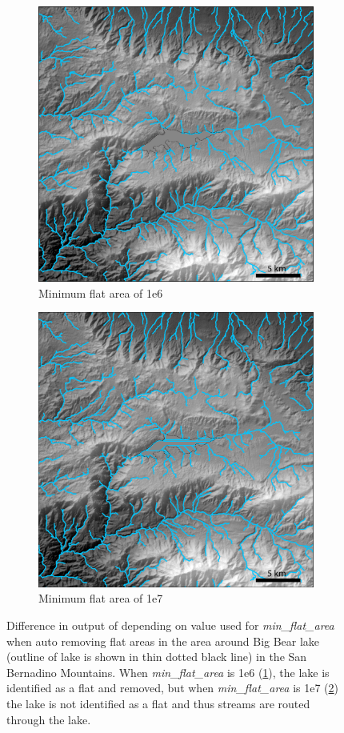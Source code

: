 \begin{figure}[H]
	\centering
	\begin{subfigure}{.40\textwidth}
		\centering
		\includegraphics[width=.8\linewidth]{PNGs/BigBear1e6.png}
		\caption{Minimum flat area of 1e6}
		\label{fig:mfsub1}
	\end{subfigure}%
	\begin{subfigure}{.40\textwidth}
		\centering
		\includegraphics[width=.8\linewidth]{PNGs/BigBear1e7.png}
		\caption{Minimum flat area of 1e7}
		\label{fig:mfsub2}
	\end{subfigure}
	\caption{Difference in output of  depending on value used for \textit{min\_flat\_area} when auto removing flat areas in the area around Big Bear lake (outline of lake is shown in thin dotted black line) in the San Bernadino Mountains. When \textit{min\_flat\_area} is 1e6 (\ref{fig:mfsub1}), the lake is identified as a flat and removed, but when \textit{min\_flat\_area} is 1e7 (\ref{fig:mfsub2}) the lake is not identified as a flat and thus streams are routed through the lake.}
	\label{fig:min_flat}
\end{figure}

